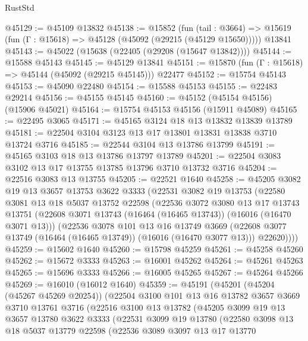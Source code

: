 \begin{lexlean}{RustStd}
\begin{coremodule}
@45129 := @45109 @13832
@45138 := @15852
    (fun (tail : @3664) => @15619 (fun (Γ : @15618) => @45128 (@45092 (@29215 (@45129 @15650)))))
    @13841
@45143 := @45022 (@15638 (@22405 (@29208 (@15647 @13842))))
@45144 := @15588 @45143
@45145 := @45129 @13841
@45151 := @15870 (fun (Γ : @15618) => @45144 (@45092 (@29215 @45145))) @22477
@45152 := @15754 @45143
@45153 := @45090 @22480
@45154 := @15588 @45153
@45155 := @22483 @29214
@45156 := @45155 @45145
@45160 := @45152 (@45154 @45156) (@15906 @45021)
@45164 := @15754 @45153 @45156 (@15911 @45089)
@45165 := @22495 @3065
@45171 := @45165 @3124 @18 @13 @13832 @13839 @13789
@45181 := @22504 @3104 @3123 @13 @17 @13801 @13831 @13838 @3710 @13724 @3716
@45185 := @22544 @3104 @13 @13786 @13799
@45191 := @45165 @3103 @18 @13 @13786 @13797 @13789
@45201 := @22504 @3083 @3102 @13 @17 @13755 @13785 @13796 @3710 @13732 @3716
@45204 := @22516 @3083 @13 @13755
@45205 := @22521 @1640
@45258 := @45205
    @3082
    @19
    @13
    @3657
    @13753
    @3622
    @3333
    (@22531
      @3082
      @19
      @13753
      (@22580
        @3081
        @13
        @18
        @5037
        @13752
        @22598
        (@22536
          @3072
          @3080
          @13
          @17
          @13743
          @13751
          (@22608 @3071 @13743 (@16464 (@16465 @13743)) (@16016 (@16470 @3071 @13)))
          (@22536
            @3078
            @101
            @13
            @16
            @13749
            @3669
            (@22608 @3077 @13749 (@16464 (@16465 @13749)) (@16016 (@16470 @3077 @13)))
            @22620))))
@45259 := @15602 @1640
@45260 := @15798 @45259
@45261 := @45258 @45260
@45262 := @15672 @3333
@45263 := @16001 @45262
@45264 := @45261 @45263
@45265 := @15696 @3333
@45266 := @16005 @45265
@45267 := @45264 @45266
@45269 := @16010 (@16012 @1640)
@45359 := @45191
    (@45201
      (@45204 (@45267 @45269 @20254))
      (@22504
        @3100
        @101
        @13
        @16
        @13782
        @3657
        @3669
        @3710
        @13761
        @3716
        (@22516
          @3100
          @13
          @13782
          (@45205
            @3099
            @19
            @13
            @3657
            @13780
            @3622
            @3333
            (@22531
              @3099
              @19
              @13780
              (@22580
                @3098
                @13
                @18
                @5037
                @13779
                @22598
                (@22536
                  @3089
                  @3097
                  @13
                  @17
                  @13770

\end{coremodule}
\end{lexlean}
